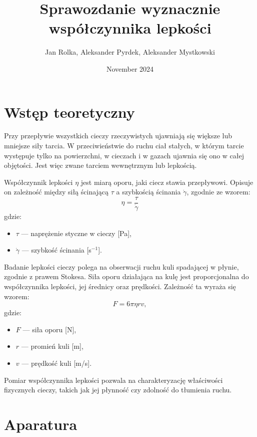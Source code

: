 \documentclass{article}
\title{Sprawozdanie wyznacznie współczynnika lepkości}
\author{Jan Rolka, Aleksander Pyrdek, Aleksander Mystkowski}
\date{November 2024}
\begin{document}
\maketitle

\section{Wstęp teoretyczny}

\vspace{0.5cm}

Przy przepływie wszystkich cieczy rzeczywistych ujawniają się większe lub mniejsze siły tarcia. W przeciwieństwie do ruchu ciał stałych, w którym tarcie występuje tylko na powierzchni, w cieczach i w gazach ujawnia się ono w całej objętości. Jest więc zwane tarciem wewnętrznym lub lepkością.

\vspace{0.5cm}

Współczynnik lepkości \(\eta\) jest miarą oporu, jaki ciecz stawia przepływowi. Opisuje on zależność między siłą ścinającą \(\tau\) a szybkością ścinania \(\dot{\gamma}\), zgodnie ze wzorem:
\[
\eta = \frac{\tau}{\dot{\gamma}}
\]
gdzie:
\begin{itemize}
    \item \(\tau\) — naprężenie styczne w cieczy [Pa],
    \item \(\dot{\gamma}\) — szybkość ścinania [s\(^{-1}\)].
\end{itemize}

\vspace{0.5cm}

Badanie lepkości cieczy polega na obserwacji ruchu kuli spadającej w płynie, zgodnie z prawem Stokesa. Siła oporu działająca na kulę jest proporcjonalna do współczynnika lepkości, jej średnicy oraz prędkości. Zależność ta wyraża się wzorem:
\[
F = 6 \pi \eta r v,
\]
gdzie:
\begin{itemize}
    \item \(F\) — siła oporu [N],
    \item \(r\) — promień kuli [m],
    \item \(v\) — prędkość kuli [m/s].
\end{itemize}

\vspace{0.5cm}

Pomiar współczynnika lepkości pozwala na charakteryzację właściwości fizycznych cieczy, takich jak jej płynność czy zdolność do tłumienia ruchu.


\section{Aparatura}
\end{document}
